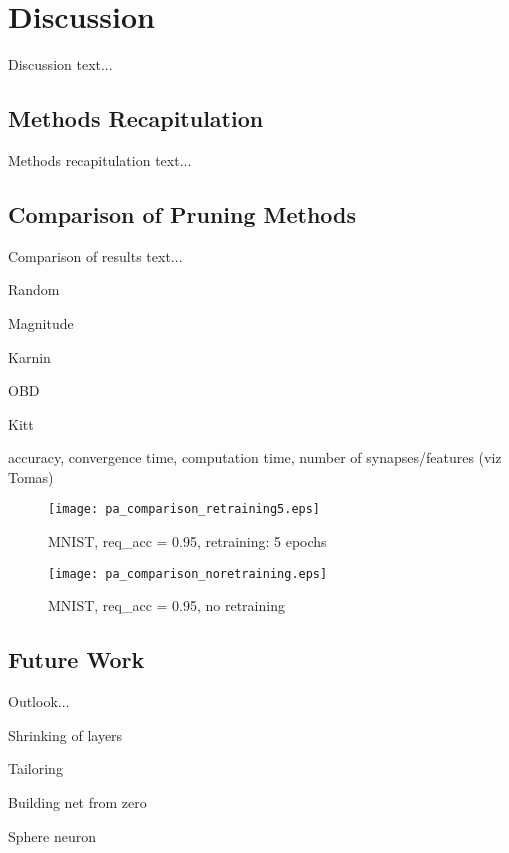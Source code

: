 \chapter{Discussion} \label{chap:discussion}
Discussion text...

\section{Methods Recapitulation} \label{sec:methods_recapitulation}
Methods recapitulation text...

\section{Comparison of Pruning Methods} \label{sec:comparison_of_pruning_methods}
Comparison of results text...

Random

Magnitude

Karnin

OBD

Kitt

accuracy, convergence time, computation time, number of synapses/features (viz Tomas)

\begin{figure}[H]
\centering
\texttt{[image: pa\_comparison\_retraining5.eps]}
\caption{MNIST, req\_acc = 0.95, retraining: 5 epochs}
\label{fig:discussion:pa_comparison_retraining5}
\end{figure}

\begin{figure}[H]
\centering
\texttt{[image: pa\_comparison\_noretraining.eps]}
\caption{MNIST, req\_acc = 0.95, no retraining}
\label{fig:discussion:pa_comparison_noretraining}
\end{figure}

\section{Future Work} \label{sec:future_work}
Outlook...

Shrinking of layers

Tailoring

Building net from zero

Sphere neuron